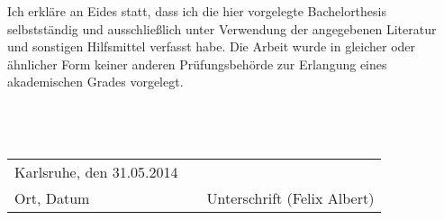 \newpage
\vspace{1cm}
Ich erkläre an Eides statt, dass ich die hier vorgelegte Bachelorthesis selbstständig und ausschließlich unter Verwendung der angegebenen Literatur und sonstigen Hilfsmittel verfasst habe. Die Arbeit wurde in gleicher oder ähnlicher Form keiner anderen Prüfungsbehörde zur Erlangung eines akademischen Grades vorgelegt.
\\ \\ \\ \\
\begin{tabularx}{\linewidth}{X l X}
	Karlsruhe, den 31.05.2014	& \qquad \qquad \qquad	& \\
	\cline{1-1}
	\cline{3-3}
	Ort, Datum	& \qquad \qquad \qquad	& Unterschrift (Felix Albert) \\
\end{tabularx}

	\vfill

\newpage
